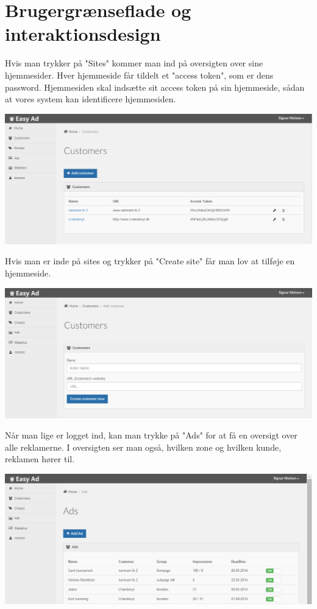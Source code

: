 \documentclass[a4paper,12pt]{article}
\begin{document}
\section{Brugergrænseflade og interaktionsdesign}
Hvis man trykker på "Sites" kommer man ind på oversigten over sine hjemmesider. Hver hjemmeside får tildelt et "access token", som er dens password. Hjemmesiden skal indsætte sit access token på sin hjemmeside, sådan at vores system kan identificere hjemmesiden.
\\
\centerline{\includegraphics[width=\textwidth]{customers.png}}
\newline
\newline
\newline
Hvis man er inde på sites og trykker på "Create site" får man lov at tilføje en hjemmeside.
\\
\centerline{\includegraphics[width=\textwidth]{customer_add.png}}
\newline
\newline
\newline
Når man lige er logget ind, kan man trykke på "Ads" for at få en oversigt over alle reklamerne. I oversigten ser man også, hvilken zone og hvilken kunde, reklamen hører til.
\\
\centerline{\includegraphics[width=\textwidth]{ads.png}}
\end{document}
